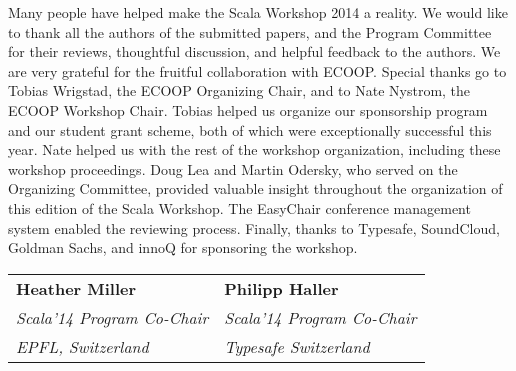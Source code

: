 \documentclass[10pt]{book}
\begin{document}
\noindent
Many people have helped make the Scala Workshop 2014 a reality. We would like
to thank all the authors of the submitted papers, and the Program Committee
for their reviews, thoughtful discussion, and helpful feedback to the authors.
We are very grateful for the fruitful collaboration with ECOOP. Special thanks
go to Tobias Wrigstad, the ECOOP Organizing Chair, and to Nate Nystrom, the
ECOOP Workshop Chair. Tobias helped us organize our sponsorship program and
our student grant scheme, both of which were exceptionally successful this
year. Nate helped us with the rest of the workshop organization, including
these workshop proceedings. Doug Lea and Martin Odersky, who served on the
Organizing Committee, provided valuable insight throughout the organization
of this edition of the Scala Workshop. The EasyChair conference management system
enabled the reviewing  process. Finally, thanks to Typesafe, SoundCloud, Goldman
Sachs, and innoQ for sponsoring the workshop.
\\

\begin{tabular}{ll}
{\bf Heather Miller}              & {\bf Philipp Haller}\\
{\em Scala'14 Program Co-Chair}   & {\em Scala'14 Program Co-Chair}\\
{\em EPFL, Switzerland}           & {\em Typesafe Switzerland}\\
\end{tabular}
\end{document}

